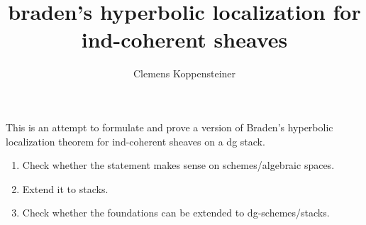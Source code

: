 \documentclass[english]{short-notes}
\title{braden's hyperbolic localization for ind-coherent sheaves}
\author{Clemens Koppensteiner}
\begin{document}
\maketitle

This is an attempt to formulate and prove a version of Braden's hyperbolic localization theorem \cite{Braden:2003:HyperbolicLocalizationOfIC, DrinfeldGaitsgory:arXiv:OnATheoremOfBraden} for ind-coherent sheaves on a dg stack.

\begin{enumerate}
    \item Check whether the statement makes sense on schemes/algebraic spaces.
    \item Extend it to stacks.
    \item Check whether the foundations can be extended to dg-schemes/stacks.
\end{enumerate}

\printbibliography
\end{document}
